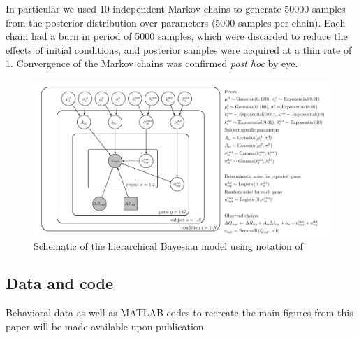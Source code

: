 \documentclass[12pt]{article}
\begin{document}
	In particular we used 10 independent Markov chains to generate 50000 samples from the posterior distribution over parameters (5000 samples per chain).  Each chain had a burn in period of 5000 samples, which were discarded to reduce the effects of initial conditions, and posterior samples were acquired at a thin rate of 1.  Convergence of the Markov chains was confirmed {\it post hoc} by eye. 
	
	\begin{figure}[H]
		\begin{center}
			\includegraphics[width=1\textwidth]{figures/EEHorizon_2sigma.pdf}
    			\caption{Schematic of the hierarchical Bayesian model using notation of \cite{lee_wagenmakers_2014}}
			\label{fig:model}
		\end{center}
	\end{figure}
	
	\subsection*{Data and code}
	Behavioral data as well as MATLAB codes to recreate the main figures from this paper will be made available upon publication. %
	
	
	
	
	
	\cleardoublepage
	\ifdefined{}
	\else
	\fi
	

	
\end{document}

